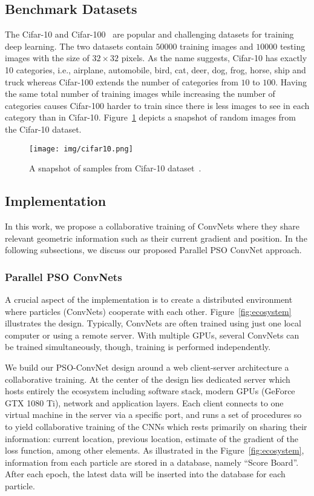 \documentclass{ieeeaccess}
\begin{document}
\subsection{Benchmark Datasets}
The Cifar-10 and Cifar-100~\cite{krizhevsky2009learning} are popular and challenging datasets for training deep learning. The two datasets contain $50000$ training images and $10000$ testing images with the size of $32 \times 32$ pixels. As the name suggests, Cifar-10 has exactly 10 categories, i.e., airplane, automobile, bird, cat, deer, dog, frog, horse, ship and truck whereas Cifar-100 extends the number of categories from $10$ to $100$. Having the same total number of training images while increasing the number of categories causes Cifar-100 harder to train since there is less images to see in each category than in Cifar-10. Figure~\ref{fig:cifar10} depicts a snapshot of random images from the Cifar-10 dataset.
\begin{figure}[htb!]
\begin{center}
\texttt{[image: img/cifar10.png]}
\caption{A snapshot of samples from Cifar-10 dataset~\cite{krizhevsky2014cifar}.}
\label{fig:cifar10}
\end{center}
\end{figure}
\subsection{Implementation}
In this work, we propose a collaborative training of ConvNets where they share relevant geometric information such as their current gradient and position. In the following subsections, we discuss our proposed Parallel PSO ConvNet approach.
\subsubsection{Parallel PSO ConvNets}
A crucial aspect of the implementation is to create a distributed environment where particles (ConvNets) cooperate with each other. Figure~\ref{fig:ecosystem} illustrates the design. Typically, ConvNets are often trained using just one local computer or using a remote server. With multiple GPUs, several ConvNets can be trained simultaneously, though, training is performed independently.

We build our PSO-ConvNet design around a web client-server architecture a collaborative training. At the center of the design lies dedicated server which hosts entirely the ecosystem including software stack, modern GPUs (GeForce\textsuperscript{\textregistered} GTX 1080 Ti), network and application layers. Each client connects to one virtual machine in the server via a specific port, and runs a set of procedures so to yield collaborative training of the CNNs which rests primarily on sharing their information: current location, previous location, estimate of the gradient of the loss function, among other elements. As illustrated in the Figure~\ref{fig:ecosystem}, information from each particle are stored in a database, namely ``Score Board''. After each epoch, the latest data will be
inserted into the database for each particle.
\end{document}
